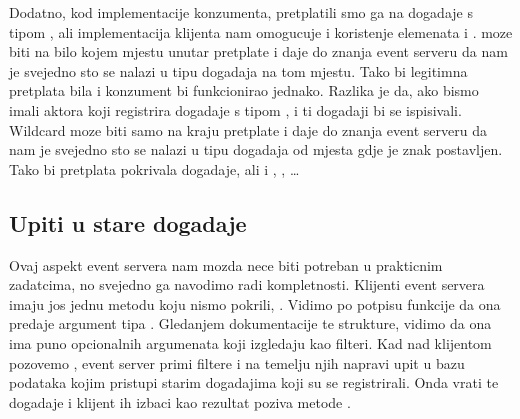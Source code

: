 \documentclass[letterpaper,10pt,croatian]{sphinxmanual}
\begin{document}
\sphinxAtStartPar
Dodatno, kod implementacije konzumenta, pretplatili smo ga na dogadaje s tipom
, ali implementacija klijenta nam
omogucuje i koristenje  elemenata \sphinxcode{\sphinxupquote{\textquotesingle{}*\textquotesingle{}}} i .  moze biti
na bilo kojem mjestu unutar pretplate i daje do znanja event serveru da nam je
svejedno sto se nalazi u tipu dogadaja na tom mjestu. Tako bi legitimna
pretplata bila  i konzument bi funkcionirao
jednako. Razlika je da, ako bismo imali aktora koji registrira dogadaje s tipom
, i ti dogadaji bi se ispisivali. Wildcard
\sphinxcode{\sphinxupquote{\textquotesingle{}*\textquotesingle{}}} moze biti samo na kraju pretplate i daje do znanja event serveru da nam
je svejedno sto se nalazi u tipu dogadaja od mjesta gdje je znak postavljen.
Tako bi pretplata  pokrivala  dogadaje, ali i , , …


\subsection{Upiti u stare dogadaje}
\label{\detokenize{hat/event_bus:upiti-u-stare-dogadaje}}
\sphinxAtStartPar
Ovaj aspekt event servera nam mozda nece biti potreban u prakticnim zadatcima,
no svejedno ga navodimo radi kompletnosti. Klijenti event servera imaju jos
jednu metodu koju nismo pokrili, .
Vidimo po potpisu funkcije da ona predaje argument tipa .
Gledanjem dokumentacije te strukture, vidimo da ona ima puno opcionalnih
argumenata koji izgledaju kao filteri. Kad nad klijentom pozovemo ,
event server primi filtere i na temelju njih napravi upit u bazu podataka kojim
pristupi starim dogadajima koji su se registrirali. Onda vrati te dogadaje i
klijent ih izbaci kao rezultat poziva metode .
\end{document}
